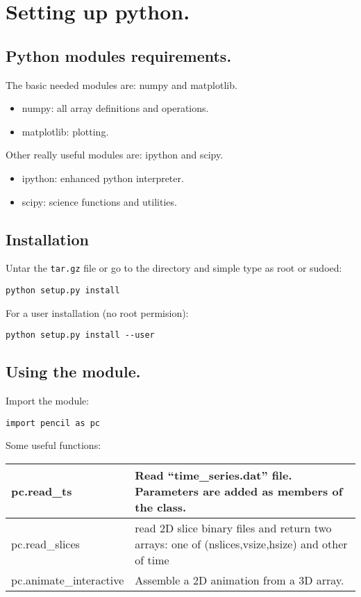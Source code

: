 \documentclass[a4paper,12pt]{article}
\begin{document}
\section{Setting up python.}
\subsection{Python modules requirements.}
The basic needed modules are: numpy and matplotlib.
\begin{itemize}
 \item numpy: all array definitions and operations.
  \item matplotlib: plotting.
\end{itemize}

Other really useful modules are: ipython and scipy.

\begin{itemize}
 \item ipython: enhanced python interpreter.
  \item scipy: science functions and utilities.
\end{itemize}


\subsection{Installation}
Untar the \texttt{tar.gz} file or go to the directory and simple type as root or sudoed:
\begin{verbatim}
python setup.py install
\end{verbatim}
For a user installation (no root permision):
\begin{verbatim}
python setup.py install --user
\end{verbatim}

\subsection{Using the module.}
Import the module:
\begin{verbatim}
import pencil as pc
\end{verbatim}
Some useful functions:
\begin{center}
\begin{tabular}{|l|l|}\hline
pc.read\_ts & Read ``time\_series.dat'' file. Parameters are added as members of the class. \\\hline
pc.read\_slices & read 2D slice binary files and return two arrays: one of (nslices,vsize,hsize) and other of time\\\hline
pc.animate\_interactive &  Assemble a 2D animation from a 3D array. \\\hline
\end{tabular}
\end{center}
\end{document}
